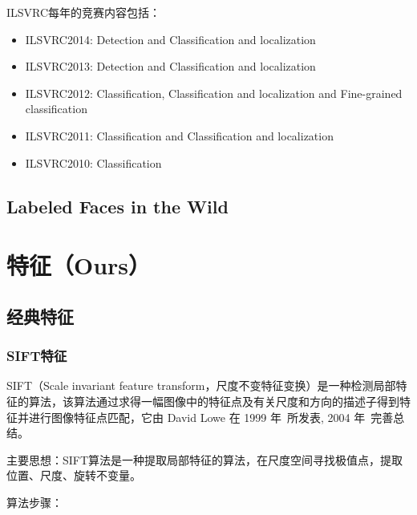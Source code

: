 \documentclass[12pt]{article}
\begin{document}
ILSVRC每年的竞赛内容包括：

\begin{itemize}
\item ILSVRC2014: {\color{blue}Detection} and {\color{blue}Classification and localization}
\item ILSVRC2013: {\color{blue}Detection} and {\color{blue}Classification and localization}
\item ILSVRC2012: {\color{blue}Classification}, {\color{blue}Classification and localization} and {\color{blue}Fine-grained classification}
\item ILSVRC2011: {\color{blue}Classification} and {\color{blue}Classification and localization}
\item ILSVRC2010: {\color{blue}Classification}
\end{itemize}

\subsection{Labeled Faces in the Wild}

\section{特征（Ours）}

\subsection{经典特征}

\subsubsection{SIFT特征}

SIFT（Scale invariant feature transform，尺度不变特征变换）是一种检测局部特征的算法，该算法通过求得一幅图像中的特征点及有关尺度和方向的描述子得到特征并进行图像特征点匹配，它由 David Lowe 在 1999 年~\cite{lowe1999object}所发表, 2004 年~\cite{lowe2004distinctive}完善总结。%

{\color{blue}主要思想}：SIFT算法是一种提取局部特征的算法，在尺度空间寻找极值点，提取位置、尺度、旋转不变量。

{\color{blue}算法步骤}：
\end{document}
